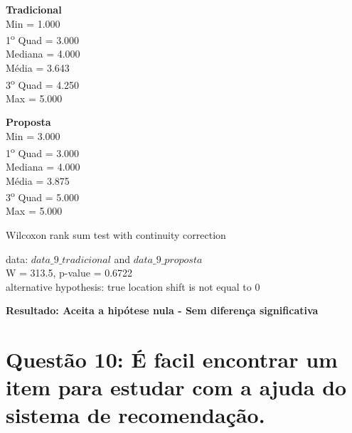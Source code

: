 \begin{multicols}{2}

\noindent\textbf{Tradicional}\\
Min = 1.000\\
1\textsuperscript{o} Quad = 3.000\\
Mediana = 4.000\\
Média = 3.643\\
3\textsuperscript{o} Quad = 4.250\\
Max = 5.000\\
\columnbreak

\noindent\textbf{Proposta}\\
Min = 3.000\\
1\textsuperscript{o} Quad = 3.000\\
Mediana = 4.000\\
Média = 3.875\\
3\textsuperscript{o} Quad = 5.000\\
Max = 5.000
\end{multicols}

Wilcoxon rank sum test with continuity correction

\noindent
data:  $data\_9\_tradicional$ and $data\_9\_proposta$\\
W = 313.5, p-value = 0.6722\\
alternative hypothesis: true location shift is not equal to 0

\noindent
\textbf{Resultado: Aceita a hipótese nula - Sem diferença significativa}

\newpage
\section{Questão 10: É facil encontrar um item para estudar com a ajuda do sistema de recomendação.}

